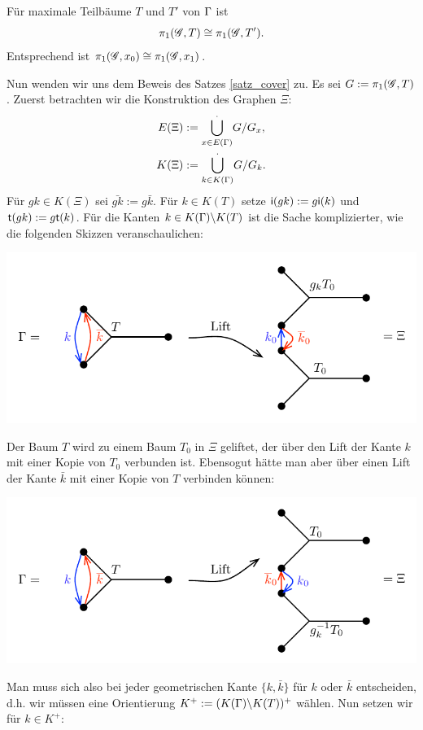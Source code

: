 \documentclass[a4paper, 12pt, twoside]{article}
\begin{document}
\FOLG Für maximale Teilbäume $T$ und $T'$ von $\Gamma$ ist
\[
\pi_1(\mathscr{G},T) \cong \pi_1(\mathscr{G},T').
\]
Entsprechend ist $\pi_1(\mathscr{G},x_0)\cong\pi_1(\mathscr{G},x_1)$.

Nun wenden wir uns dem Beweis des Satzes \ref{satz_cover} zu.
Es sei $G:= \pi_1(\mathscr{G},T)$.
Zuerst betrachten wir die Konstruktion des Graphen $\Xi$:
\begin{align*}
E(\Xi) &:= \overset{.}{\underset{x\in E(\Gamma)}{\mathop{\bigcup}}} G/G_x, \\
K(\Xi) &:= \overset{.}{\underset{k\in K(\Gamma)}{\mathop{\bigcup}}} G/G_k.
\end{align*}
Für $gk\in K(\Xi)$ sei $\bar{gk}:=g\bar{k}$.
Für $k\in K(T)$ setze $\mathsf{i}(gk):=g\mathsf{i}(k)$ und
$\mathsf{t}(gk):=g\mathsf{t}(k)$.
Für die Kanten $k\in K(\Gamma)\backslash K(T)$ ist die Sache 
komplizierter, wie die folgenden Skizzen veranschaulichen:
\begin{center}
	\includegraphics{grugraImages/T01}
\end{center}
Der Baum $T$ wird zu einem Baum $T_0$ in $\Xi$ geliftet, der
über den Lift der Kante $k$ mit einer Kopie von $T_0$ verbunden ist.
Ebensogut hätte man aber über einen Lift der Kante $\bar{k}$
mit einer Kopie von $T$ verbinden können:
\begin{center}
	\includegraphics{grugraImages/T02}
\end{center}
Man muss sich also bei jeder geometrischen Kante $\{k,\bar{k}\}$
für $k$ oder $\bar{k}$ entscheiden, d.h. wir müssen eine Orientierung
$K^+ := (K(\Gamma)\backslash K(T))^+$ wählen.
Nun setzen wir für $k\in K^+$:
\end{document}
